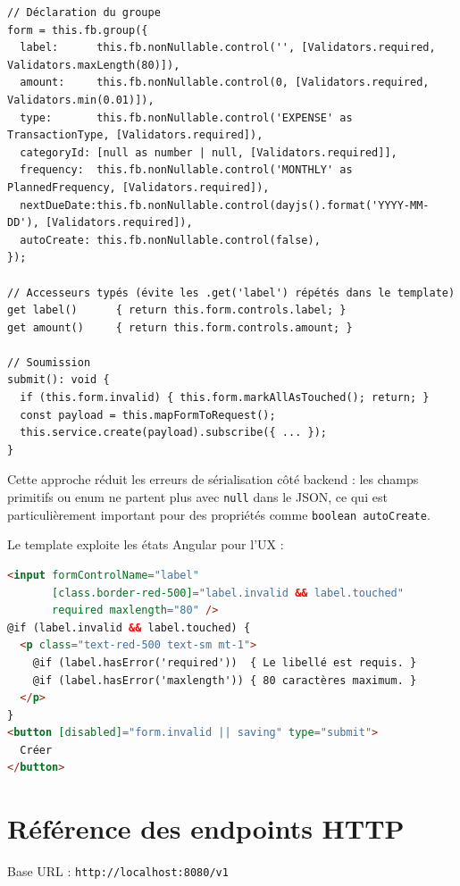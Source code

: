 \documentclass[12pt,a4paper]{article}
\begin{document}
\begin{lstlisting}
// Déclaration du groupe
form = this.fb.group({
  label:      this.fb.nonNullable.control('', [Validators.required, Validators.maxLength(80)]),
  amount:     this.fb.nonNullable.control(0, [Validators.required, Validators.min(0.01)]),
  type:       this.fb.nonNullable.control('EXPENSE' as TransactionType, [Validators.required]),
  categoryId: [null as number | null, [Validators.required]],
  frequency:  this.fb.nonNullable.control('MONTHLY' as PlannedFrequency, [Validators.required]),
  nextDueDate:this.fb.nonNullable.control(dayjs().format('YYYY-MM-DD'), [Validators.required]),
  autoCreate: this.fb.nonNullable.control(false),
});

// Accesseurs typés (évite les .get('label') répétés dans le template)
get label()      { return this.form.controls.label; }
get amount()     { return this.form.controls.amount; }

// Soumission
submit(): void {
  if (this.form.invalid) { this.form.markAllAsTouched(); return; }
  const payload = this.mapFormToRequest();
  this.service.create(payload).subscribe({ ... });
}
\end{lstlisting}

Cette approche réduit les erreurs de sérialisation côté backend : les champs
primitifs ou enum ne partent plus avec \texttt{null} dans le JSON, ce qui est
particulièrement important pour des propriétés comme \texttt{boolean autoCreate}.

Le template exploite les états Angular pour l'UX :

\begin{lstlisting}[language=html, numbers=none]
<input formControlName="label"
       [class.border-red-500]="label.invalid && label.touched"
       required maxlength="80" />
@if (label.invalid && label.touched) {
  <p class="text-red-500 text-sm mt-1">
    @if (label.hasError('required'))  { Le libellé est requis. }
    @if (label.hasError('maxlength')) { 80 caractères maximum. }
  </p>
}
<button [disabled]="form.invalid || saving" type="submit">
  Créer
</button>
\end{lstlisting}

\section{Référence des endpoints HTTP}

Base URL : \texttt{http://localhost:8080/v1}
\end{document}

